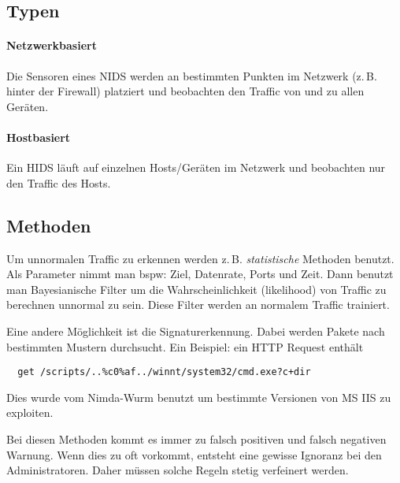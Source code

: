 \subsection{Typen}%
\label{sub:typen}

\paragraph{Netzwerkbasiert}%
\label{par:netzwerkbasiert}

Die Sensoren eines NIDS werden an bestimmten Punkten im Netzwerk (z.\,B. hinter der
Firewall) platziert und beobachten den Traffic von und zu allen Geräten.

\paragraph{Hostbasiert}%
\label{par:hostbasiert}

Ein HIDS läuft auf einzelnen Hosts/Geräten im Netzwerk und beobachten nur den Traffic des
Hosts.

\subsection{Methoden}%
\label{sub:methoden}

Um unnormalen Traffic zu erkennen werden z.\,B. \emph{statistische} Methoden benutzt.
Als Parameter nimmt man bspw: Ziel, Datenrate, Ports und Zeit.
Dann benutzt man Bayesianische Filter um die Wahrscheinlichkeit (likelihood) von Traffic
zu berechnen unnormal zu sein.
Diese Filter werden an normalem Traffic trainiert.

Eine andere Möglichkeit ist die Signaturerkennung.
Dabei werden Pakete nach bestimmten Mustern durchsucht.
Ein Beispiel: ein HTTP Request enthält
\begin{verbatim}
  get /scripts/..%c0%af../winnt/system32/cmd.exe?c+dir
\end{verbatim}
Dies wurde vom Nimda-Wurm benutzt um bestimmte Versionen von MS IIS zu exploiten.

Bei diesen Methoden kommt es immer zu falsch positiven und falsch negativen Warnung.
Wenn dies zu oft vorkommt, entsteht eine gewisse Ignoranz bei den Administratoren.
Daher müssen solche Regeln stetig verfeinert werden.
